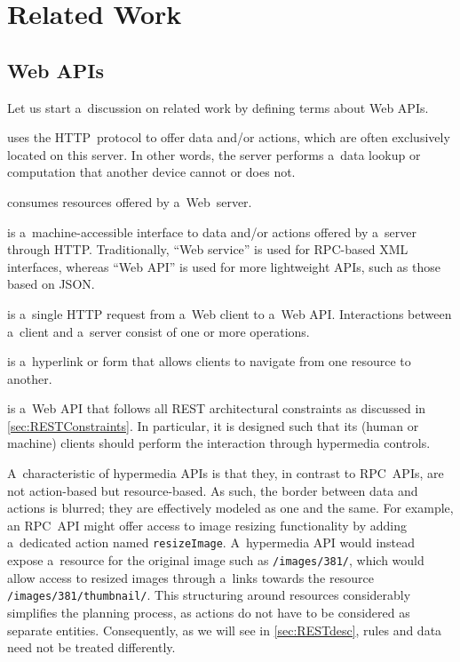 \section{Related Work}
\label{sec:RelatedWork}

\subsection{Web APIs}
Let us start a~discussion on related work by defining terms about Web APIs.

\begin{description}\label{api}
  \item[A~Web server] uses the HTTP~protocol
    to offer data and/or actions,
    which are often exclusively located on this server.
    In other words, the server performs a~data lookup or computation
    that another device cannot or does not.
  \item[A~Web client] consumes resources offered by a~Web~server.
  \item[A~Web service or Web API] is a~machine-accessible interface
    to data and/or actions offered by a~server through HTTP.
    Traditionally, \enquote{Web service} is used for RPC-based XML interfaces,
    whereas \enquote{Web API} is used for more lightweight APIs,
    such as those based on JSON.
  \item[A~Web API operation]
    is a~single HTTP request from a~Web client to a~Web API.
    Interactions between a~client and a~server consist of one or more operations.
  \item[A~hypermedia control] is a~hyperlink or form
    that allows clients to navigate from one resource to another.
  \item[A~hypermedia API] is a~Web API
    that follows all REST architectural constraints
    as discussed in \cref{sec:RESTConstraints}.
    In particular, it is designed such that its (human or machine) clients
    should perform the interaction through hypermedia controls.
\end{description}

A~characteristic of hypermedia APIs is that they,
in contrast to RPC~APIs,
are not action-based but resource-based.
As such, the border between data and actions is blurred;
they are effectively modeled as one and the same.
For example, an RPC~API might offer access to image resizing functionality
by adding a~dedicated action named \verb!resizeImage!.
A~hypermedia API would instead expose a~resource for the original image
such as \verb!/images/381/!,
which would allow access to resized images
through a~links towards the resource \verb!/images/381/thumbnail/!.
This structuring around resources
considerably simplifies the planning process,
as actions do not have to be considered as separate entities.
Consequently, as we will see in \cref{sec:RESTdesc},
rules and data need not be treated differently.

